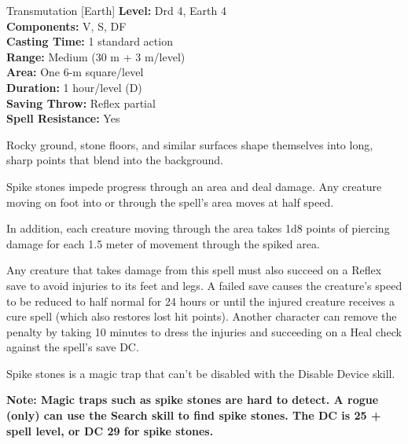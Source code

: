 {Transmutation [Earth]}
{
	\textbf{Level:}
	Drd 4, Earth 4\\
	\textbf{Components:}
	V, S, DF\\
	\textbf{Casting Time:}
	1 standard action\\
	\textbf{Range:}
	Medium (30 m + 3 m/level)\\
	\textbf{Area:}
	One 6-m square/level\\
	\textbf{Duration:}
	1 hour/level (D)\\
	\textbf{Saving Throw:}
	Reflex partial\\
	\textbf{Spell Resistance:}
	Yes\\
}
{
	Rocky ground, stone floors, and similar surfaces shape themselves into long, sharp points that blend into the background.

	Spike stones impede progress through an area and deal damage. Any creature moving on foot into or through the spell's area moves at half speed.

	In addition, each creature moving through the area takes 1d8 points of piercing damage for each 1.5 meter of movement through the spiked area.

	Any creature that takes damage from this spell must also succeed on a Reflex save to avoid injuries to its feet and legs. A failed save causes the creature's speed to be reduced to half normal for 24 hours or until the injured creature receives a cure spell (which also restores lost hit points). Another character can remove the penalty by taking 10 minutes to dress the injuries and succeeding on a Heal check against the spell's save DC.

	Spike stones is a magic trap that can't be disabled with the Disable Device skill.

	\textbf{Note: Magic traps such as spike stones are hard to detect. A rogue (only) can use the Search skill to find spike stones. The DC is 25 + spell level, or DC 29 for spike stones.}

}
